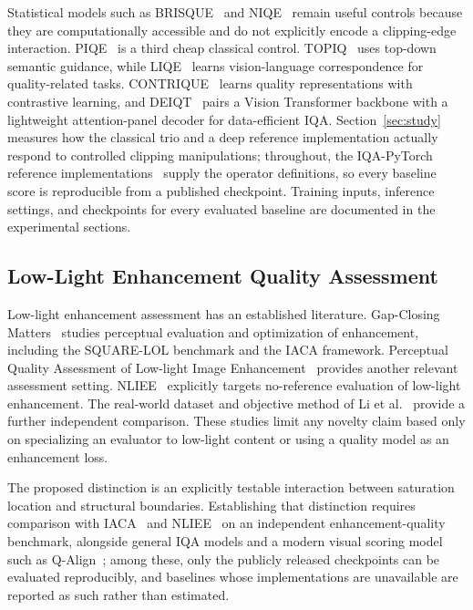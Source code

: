 \documentclass[5p,times,twocolumn]{elsarticle}
\begin{document}
Statistical models such as BRISQUE~\cite{mittal2012} and
NIQE~\cite{mittal2013} remain useful controls because they are computationally
accessible and do not explicitly encode a clipping-edge interaction.
PIQE~\cite{venkatanath2015} is a third cheap classical control.
TOPIQ~\cite{chen2024topiq} uses top-down semantic guidance, while
LIQE~\cite{zhang2023liqe} learns vision-language correspondence for
quality-related tasks. CONTRIQUE~\cite{madhusudana2022contrique} learns
quality representations with contrastive learning, and DEIQT~\cite{qin2023deiqt}
pairs a Vision Transformer backbone with a lightweight attention-panel decoder
for data-efficient IQA. Section~\ref{sec:study} measures how the classical
trio and a deep reference implementation actually respond to controlled
clipping manipulations; throughout, the IQA-PyTorch reference
implementations~\cite{pyiqa2024} supply the operator definitions, so every
baseline score is reproducible from a published checkpoint. Training inputs,
inference settings, and checkpoints for every evaluated baseline are
documented in the experimental sections.

\subsection{Low-Light Enhancement Quality Assessment}

Low-light enhancement assessment has an established literature.
Gap-Closing Matters~\cite{chen2024gapclosing} studies perceptual evaluation
and optimization of enhancement, including the SQUARE-LOL benchmark and the
IACA framework. Perceptual Quality Assessment of Low-light Image
Enhancement~\cite{zhai2021lieq} provides another relevant assessment setting.
NLIEE~\cite{zhang2021nliee} explicitly targets no-reference evaluation of
low-light enhancement. The real-world dataset and objective method of
Li et al.~\cite{li2025realworld} provide a further independent comparison.
These studies limit any novelty claim based only on specializing an evaluator
to low-light content or using a quality model as an enhancement loss.

The proposed distinction is an explicitly testable interaction between
saturation location and structural boundaries. Establishing that distinction
requires comparison with IACA~\cite{chen2024gapclosing} and
NLIEE~\cite{zhang2021nliee} on an independent enhancement-quality benchmark,
alongside general IQA models and a modern visual scoring model such as
Q-Align~\cite{wu2023qalign}; among these, only the publicly released
checkpoints can be evaluated reproducibly, and baselines whose
implementations are unavailable are reported as such rather than estimated.
\end{document}
